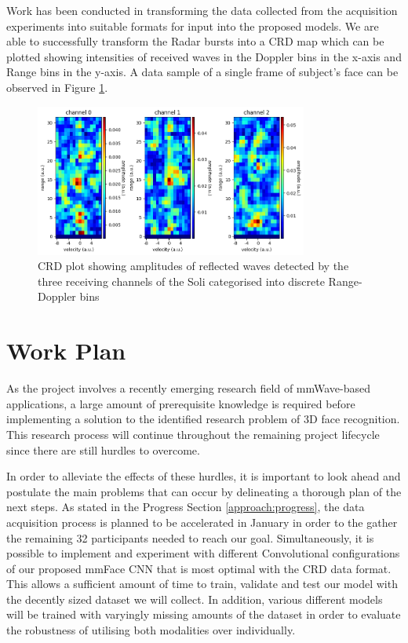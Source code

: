 \documentclass{interim}
\begin{document}
Work has been conducted in transforming the data collected from the acquisition experiments into suitable formats for input into the proposed models. We are able to successfully transform the Radar bursts into a CRD map which can be plotted showing intensities of received waves in the Doppler bins in the x-axis and Range bins in the y-axis. A data sample of a single frame of subject's face can be observed in Figure \ref{fig:crd_plot}.

\begin{figure}[h!]
    \centering
    \includegraphics[width=0.8\textwidth]{images/CRD_plot.png}
    \caption{CRD plot showing amplitudes of reflected waves detected by the three receiving channels of the Soli categorised into discrete Range-Doppler bins}
    \label{fig:crd_plot}
\end{figure}


\section{Work Plan}
As the project involves a recently emerging research field of mmWave-based applications, a large amount of prerequisite knowledge is required before implementing a solution to the identified research problem of 3D face recognition. This research process will continue throughout the remaining project lifecycle since there are still hurdles to overcome. 

In order to alleviate the effects of these hurdles, it is important to look ahead and postulate the main problems that can occur by delineating a thorough plan of the next steps. As stated in the Progress Section \ref{approach:progress}, the data acquisition process is planned to be accelerated in January in order to the gather the remaining 32 participants needed to reach our goal. Simultaneously, it is possible to implement and experiment with different Convolutional configurations of our proposed mmFace CNN that is most optimal with the CRD data format. This allows a sufficient amount of time to train, validate and test our model with the decently sized dataset we will collect. In addition, various different models will be trained with varyingly missing amounts of the dataset in order to evaluate the robustness of utilising both modalities over individually.
\end{document}
